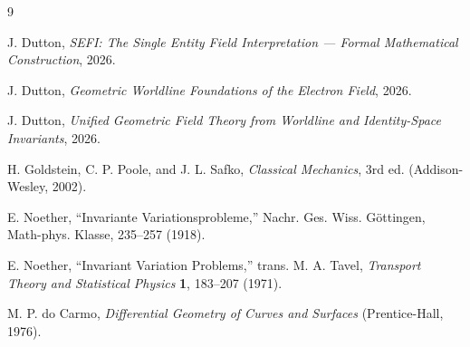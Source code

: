 \documentclass[aip,jmp,reprint,onecolumn,nofootinbib]{revtex4-2}
\begin{document}
\begin{thebibliography}{9}

J. Dutton, \emph{SEFI: The Single Entity Field Interpretation --- Formal
Mathematical Construction}, 2026.

J. Dutton, \emph{Geometric Worldline Foundations of the Electron Field}, 2026.

J. Dutton, \emph{Unified Geometric Field Theory from Worldline and
Identity-Space Invariants}, 2026.

H. Goldstein, C. P. Poole, and J. L. Safko, \emph{Classical Mechanics}, 3rd ed.
(Addison-Wesley, 2002).

E. Noether, ``Invariante Variationsprobleme,'' Nachr. Ges. Wiss. G\"ottingen,
Math-phys. Klasse, 235--257 (1918).

E. Noether, ``Invariant Variation Problems,'' trans. M. A. Tavel,
\emph{Transport Theory and Statistical Physics} \textbf{1}, 183--207 (1971).

M. P. do Carmo, \emph{Differential Geometry of Curves and Surfaces}
(Prentice-Hall, 1976).

\end{thebibliography}
\end{document}
